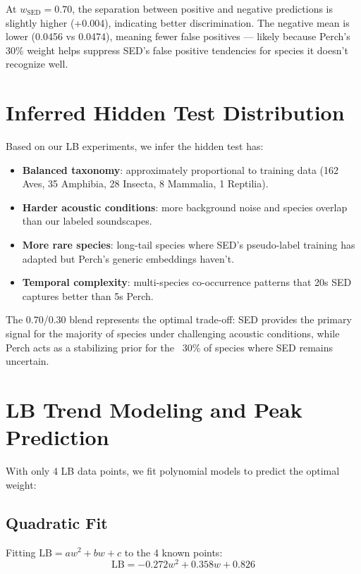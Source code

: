 \documentclass[a4paper,11pt]{article}
\begin{document}
At $w_\text{SED}=0.70$, the separation between positive and negative predictions is slightly higher (+0.004),
indicating better discrimination. The negative mean is lower (0.0456 vs 0.0474), meaning fewer false positives ---
likely because Perch's 30\% weight helps suppress SED's false positive tendencies for species it doesn't recognize well.

\section{Inferred Hidden Test Distribution}

Based on our LB experiments, we infer the hidden test has:

\begin{itemize}
\item \textbf{Balanced taxonomy}: approximately proportional to training data (162 Aves, 35 Amphibia, 28 Insecta, 8 Mammalia, 1 Reptilia).
\item \textbf{Harder acoustic conditions}: more background noise and species overlap than our labeled soundscapes.
\item \textbf{More rare species}: long-tail species where SED's pseudo-label training has adapted but Perch's generic embeddings haven't.
\item \textbf{Temporal complexity}: multi-species co-occurrence patterns that 20s SED captures better than 5s Perch.
\end{itemize}

The 0.70/0.30 blend represents the optimal trade-off: SED provides the primary signal for the majority of species under challenging acoustic conditions, while Perch acts as a stabilizing prior for the ~30\% of species where SED remains uncertain.

\section{LB Trend Modeling and Peak Prediction}

With only 4 LB data points, we fit polynomial models to predict the optimal weight:

\subsection{Quadratic Fit}

Fitting $\text{LB} = aw^2 + bw + c$ to the 4 known points:
\begin{equation}
\text{LB} = -0.272w^2 + 0.358w + 0.826
\end{equation}
\end{document}
